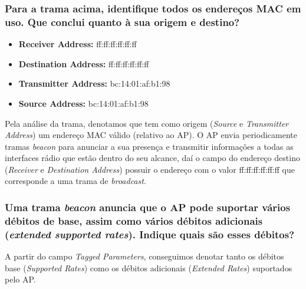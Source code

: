 \newpage
\vspace{20pt}
\subsubsection{Para a trama acima, identifique todos os endereços MAC em uso. Que conclui quanto à sua origem e destino?}

    \vspace{5pt}
    \begin{multicols}{2}
    \begin{itemize}
        \item \textbf{Receiver Address:} ff:ff:ff:ff:ff:ff
        \item \textbf{Destination Address:} ff:ff:ff:ff:ff:ff
        \item \textbf{Transmitter Address:} bc:14:01:af:b1:98
        \item \textbf{Source Address:} bc:14:01:af:b1:98
    \end{itemize}
    \end{multicols}
    
    \vspace{10pt}    
    \par Pela análise da trama, denotamos que tem como origem (\textit{Source} e \textit{Transmitter Address}) um endereço MAC válido (relativo ao AP). O AP envia periodicamente tramas \textit{beacon} para anunciar a sua presença e transmitir informações a todas as interfaces rádio que estão dentro do seu alcance, daí o campo do endereço destino (\textit{Receiver} e \textit{Destination Address}) possuir o endereço com o valor ff:ff:ff:ff:ff:ff que corresponde a uma trama de \textit{broadcast}.







\subsubsection{Uma trama \textit{beacon} anuncia que o AP pode suportar vários débitos de base, assim como vários débitos adicionais (\textit{extended supported rates}). Indique quais são esses débitos?}
    
    \par A partir do campo \textit{Tagged Parameters}, conseguimos denotar tanto os débitos base (\textit{Supported Rates}) como os débitos adicionais (\textit{Extended Rates}) suportados pelo AP.
    
